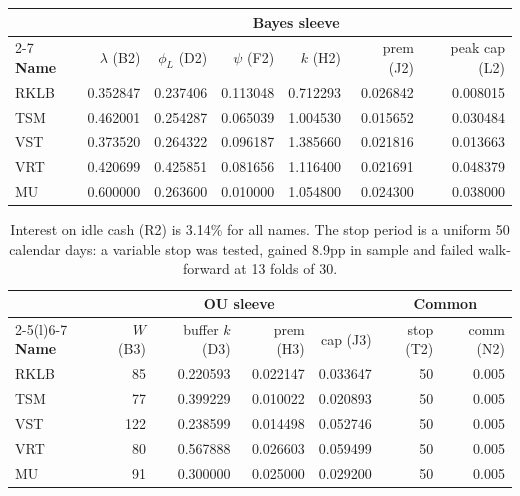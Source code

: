 \documentclass[11pt]{article}
\begin{document}
\begin{table}[H]\centering\footnotesize
\setlength{\tabcolsep}{4pt}
\begin{tabular}{lrrrrrr}
\toprule
& \multicolumn{6}{c}{\textbf{Bayes sleeve}}\\
\cmidrule(l){2-7}
\textbf{Name} & $\lambda$ (B2) & $\phi_L$ (D2) & $\psi$ (F2) & $k$ (H2) & prem (J2) &
peak cap (L2)\\
\midrule
\rowcolor{bckeep} RKLB & 0.352847 & 0.237406 & 0.113048 & 0.712293 & 0.026842 & 0.008015\\
TSM  & 0.462001 & 0.254287 & 0.065039 & 1.004530 & 0.015652 & 0.030484\\
\rowcolor{bckeep} VST  & 0.373520 & 0.264322 & 0.096187 & 1.385660 & 0.021816 & 0.013663\\
VRT  & 0.420699 & 0.425851 & 0.081656 & 1.116400 & 0.021691 & 0.048379\\
\rowcolor{bckeep} MU   & 0.600000 & 0.263600 & 0.010000 & 1.054800 & 0.024300 & 0.038000\\
\bottomrule
\end{tabular}
\end{table}

\begin{table}[H]\centering\footnotesize
\setlength{\tabcolsep}{5pt}
\begin{tabular}{lrrrrrr}
\toprule
& \multicolumn{4}{c}{\textbf{OU sleeve}} & \multicolumn{2}{c}{\textbf{Common}}\\
\cmidrule(lr){2-5}\cmidrule(l){6-7}
\textbf{Name} & $W$ (B3) & buffer $k$ (D3) & prem (H3) & cap (J3) & stop (T2) & comm (N2)\\
\midrule
\rowcolor{bckeep} RKLB & 85  & 0.220593 & 0.022147 & 0.033647 & 50 & 0.005\\
TSM  & 77  & 0.399229 & 0.010022 & 0.020893 & 50 & 0.005\\
\rowcolor{bckeep} VST  & 122 & 0.238599 & 0.014498 & 0.052746 & 50 & 0.005\\
VRT  & 80  & 0.567888 & 0.026603 & 0.059499 & 50 & 0.005\\
\rowcolor{bckeep} MU   & 91  & 0.300000 & 0.025000 & 0.029200 & 50 & 0.005\\
\bottomrule
\end{tabular}
\caption{Interest on idle cash (R2) is 3.14\% for all names. The stop period is a uniform 50
calendar days: a variable stop was tested, gained 8.9pp in sample and failed walk-forward at
13 folds of 30.}
\end{table}
\end{document}
